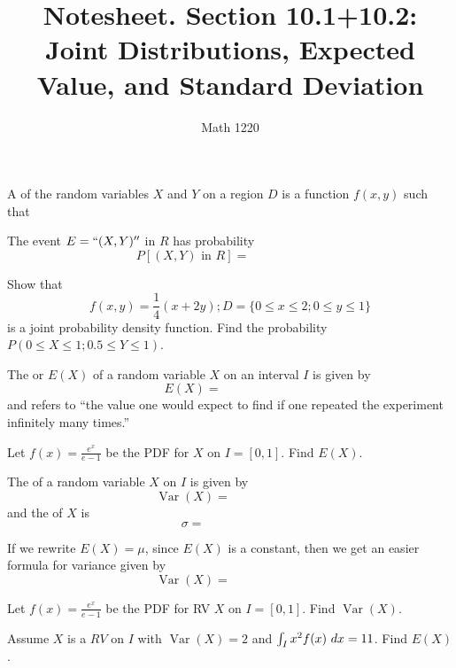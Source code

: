 \documentclass[12pt, a4paper]{article}
\author{Math 1220}
\title{Notesheet. Section 10.1+10.2: Joint Distributions, Expected
  Value, and Standard Deviation}
\date{}
\newcommand{\Var}{\operatorname{Var}}
\begin{document}
\maketitle
\nameline
\vspace{-0.3in}
\begin{defi}
  A  of the random variables
  \(X\) and \(Y\) on a region \(D\) is a function \(f(x,y)\) such that
\end{defi}
\begin{thrm}
  The event \(E = ``(X,Y)''\) in \(R\) has probability \[
    P[(X,Y) \text{ in } R] = \hspace{1in}
  \]
\end{thrm}
\vspace{-0.5in}
\begin{ex}
  Show that \[
    f(x,y) = \frac{1}{4}(x+2y); D = \{0 \leq x \leq 2; 0 \leq y \leq 1\}
  \]
  is a joint probability density function. Find the probability \(P(0
  \leq X \leq 1; 0.5 \leq Y \leq 1)\).
\end{ex}
\begin{defi}
  The  or  \(E(X)\) of a random variable
  \(X\) on an interval \(I\) is given by \[
    E(X) = \hspace{1in}
  \]
  and refers to ``the value one would expect to find if one repeated
  the experiment infinitely many times.''
\end{defi}
\begin{ex}
  Let \(f(x) = \frac{e^x}{e-1}\)  be the PDF for \(X\) on
  \(I=[0,1]\). Find \(E(X)\).
\end{ex}
\begin{defi}
  The  of a random variable \(X\) on \(I\) is given by \[
    \Var(X) = \hspace{1in}
  \]
  and the  of \(X\) is \[
    \sigma = \hspace{1in}
  \]
\end{defi}
\vspace{-0.75in}
\begin{rmk}
  If we rewrite \(E(X) = \mu\), since \(E(X)\) is a constant, then we
  get an easier formula for variance given by \[
    \Var(X) = \hspace{1in}
  \]
\end{rmk}
\begin{ex}
  Let \(f(x) = \frac{e^x}{e-1}\)  be the PDF for RV \(X\) on
  \(I=[0,1]\). Find \(\Var(X)\).
\end{ex}
\begin{ex}
  Assume \(X\) is a \(RV\) on \(I\) with \(\Var(X) = 2\) and \(\int_I
  x^2 f(x) \ d x = 11\). Find \(E(X)\).
\end{ex}
\end{document}
